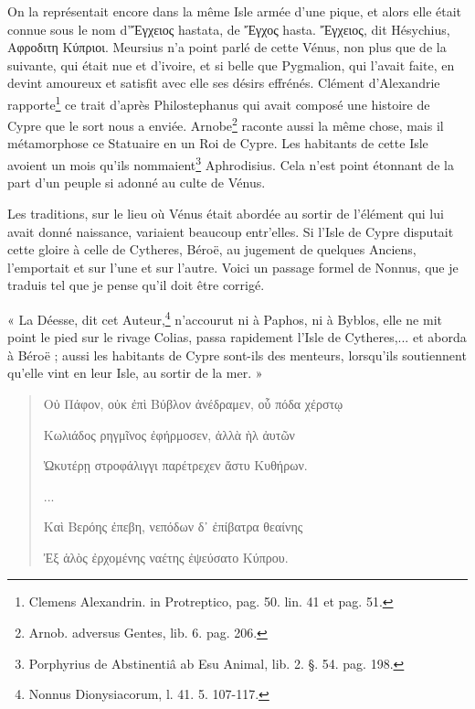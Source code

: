 \documentclass[a4paper, 18pt, oneside]{article}
\begin{document}
On la représentait encore dans la même Isle armée d'une pique, et alors elle était connue sous le nom d'Ἔγχειος hastata, de Ἔγχος hasta. Ἔγχειος, dit Hésychius, Αφροδιτη Κύπριοι. Meursius n'a point parlé de cette Vénus, non plus que de la suivante, qui était nue et d'ivoire, et si belle que Pygmalion, qui l'avait faite, en devint amoureux et satisfit avec elle ses désirs effrénés. Clément d'Alexandrie rapporte\footnote{Clemens Alexandrin. in Protreptico, pag. 50. lin. 41 et pag. 51.} ce trait d'après Philostephanus qui avait composé une histoire de Cypre que le sort nous a enviée. Arnobe\footnote{Arnob. adversus Gentes, lib. 6. pag. 206.} raconte aussi la même chose, mais il métamorphose ce Statuaire en un Roi de Cypre. Les habitants de cette Isle avoient un mois qu'ils nommaient\footnote{Porphyrius de Abstinentiâ ab Esu Animal, lib. 2. §. 54. pag. 198.} Aphrodisius. Cela n'est point étonnant de la part d'un peuple si adonné au culte de Vénus.

Les traditions, sur le lieu où Vénus était abordée au sortir de l'élément qui lui avait donné naissance, variaient beaucoup entr'elles. Si l'Isle de Cypre disputait cette gloire à celle de Cytheres, Béroë, au jugement de quelques Anciens, l'emportait et sur l'une et sur l'autre. Voici un passage formel de Nonnus, que je traduis tel que je pense qu'il doit être corrigé.

« La Déesse, dit cet Auteur,\footnote{Nonnus Dionysiacorum, l. 41. 5. 107-117.} n'accourut ni à Paphos, ni à Byblos, elle ne mit point le pied sur le rivage Colias, passa rapidement l'Isle de Cytheres,... et aborda à Béroë ; aussi les habitants de Cypre sont-ils des menteurs, lorsqu'ils soutiennent qu'elle vint en leur Isle, au sortir de la mer. »
\begin{quotation}
Οὐ Πάφον, οὐκ ἐπὶ Βύβλον ἀνέδραμεν, οὗ πόδα χέρστῳ

Κωλιάδος ρηγμῖνος ἐφήρμοσεν, ἀλλὰ ὴλ ἀυτῶν

Ὠκυτέρῃ στροφάλιγγι παρέτρεχεν ἄστυ Κυθήρων.

...

Καὶ Βερόης ἐπεβη, νεπόδων δ᾽ ἐπίβατρα θεαίνης

Ἐξ ἁλὸς ἐρχομένης ναέτης ἐψεύσατο Κύπρου.
\end{quotation}
\end{document}
